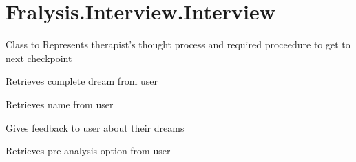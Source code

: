 \documentclass[letterpaper,10pt,english]{sphinxmanual}
\begin{document}
\chapter{Fralysis.Interview.Interview}
\label{\detokenize{index:fralysis-interview-interview}}

\begin{fulllineitems}
\label{\detokenize{index:Fralysis.Interview.Interview}}
Class to Represents therapist’s thought process and required proceedure to get to next checkpoint

\begin{fulllineitems}
\label{\detokenize{index:Fralysis.Interview.Interview.ask_for_dream}}
Retrieves complete dream from user

\end{fulllineitems}


\begin{fulllineitems}
\label{\detokenize{index:Fralysis.Interview.Interview.ask_for_name}}
Retrieves name from user

\end{fulllineitems}


\begin{fulllineitems}
\label{\detokenize{index:Fralysis.Interview.Interview.give_analysis}}
Gives feedback to user about their dreams

\end{fulllineitems}


\begin{fulllineitems}
\label{\detokenize{index:Fralysis.Interview.Interview.provide_options}}
Retrieves pre-analysis option from user

\end{fulllineitems}


\end{fulllineitems}
\end{document}
